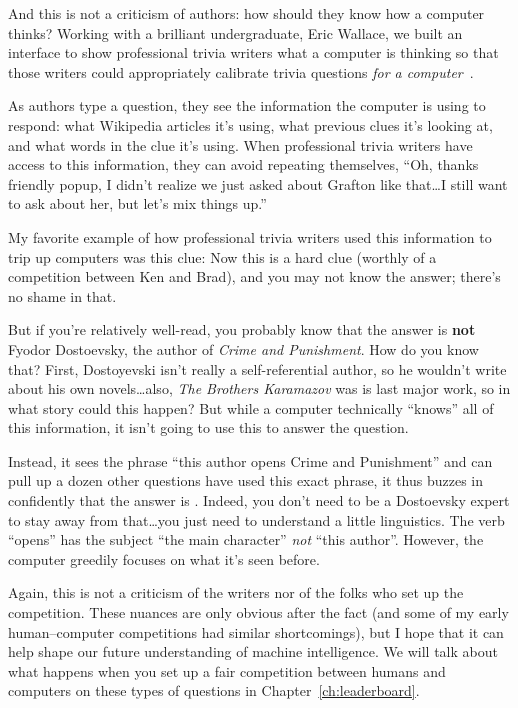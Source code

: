 


And this is not a criticism of \jeopardy{} authors: how should they
know how a computer thinks?
%
Working with a brilliant undergraduate, Eric Wallace, we built an
interface to show professional trivia writers what a computer is
thinking so that those writers could appropriately calibrate trivia
questions \emph{for a computer}~\citep{wallace-19}.

As authors type a question, they see the information the computer is
using to respond:
%
what Wikipedia articles it's using,
%
what previous clues it's looking at,
%
and what words in the clue it's using.
%
When professional trivia writers have access to this information, they can
avoid repeating themselves,
%
``Oh, thanks friendly popup, I didn't realize we just asked about
Grafton like that\dots I still want to ask about her, but let's mix
things up.''

My favorite example of how professional trivia writers used this
information to trip up computers was this clue:
%
Now this is a hard clue (worthly of a competition between Ken and
Brad), and you may not know the answer; there's no shame in that.

But if you're relatively well-read, you probably know that the answer
is {\bf not} Fyodor Dostoevsky, the author of \textit{Crime and
  Punishment}.
%
How do you know that?  
%
First, Dostoyevski isn't really a self-referential author, so he
wouldn't write about his own novels\dots also, \textit{The Brothers
  Karamazov} was is last major work, so in what story could this
happen?
%
But while a computer technically ``knows'' all of this information, it
isn't going to use this to answer the question.

Instead, it sees the phrase ``this author opens Crime and Punishment''
and can pull up a dozen other questions have used this exact phrase,
it thus buzzes in confidently that the answer is .
%
Indeed, you don't need to be a Dostoevsky expert to stay away from
that\dots you just need to understand a little linguistics.
%
The verb ``opens'' has the subject ``the main character'' \emph{not}
``this author''.
%
However, the computer greedily focuses on what it's seen before.

Again, this is not a criticism of the \jeopardy{} writers nor of the
 folks who set up the competition.
%
These nuances are only obvious after the fact (and some of my early
human--computer competitions had similar shortcomings), but I hope
that it can help shape our future understanding of machine
intelligence.
%
We will talk about what happens when you set up a fair competition between
humans and computers on these types of questions in
Chapter~\ref{ch:leaderboard}.
